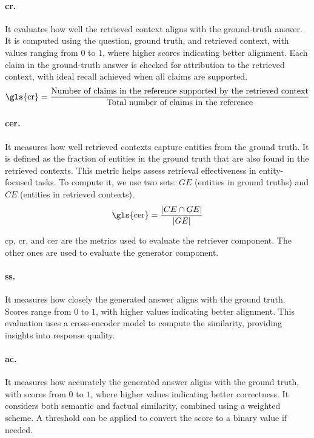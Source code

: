 \paragraph*{\gls{cr}.} It evaluates how well the retrieved context aligns with the ground-truth answer.
It is computed using the question, ground truth, and retrieved context, with values ranging from $0$ to $1$, where higher scores indicating better alignment.
Each claim in the ground-truth answer is checked for attribution to the retrieved context, with ideal recall achieved when all claims are supported.
\[
\text{\gls{cr}} =
\frac{\text{Number of claims in the reference supported by the retrieved context}}
{\text{Total number of claims in the reference}}
\]

\paragraph*{\gls{cer}.} It measures how well retrieved contexts capture entities from the ground truth.
It is defined as the fraction of entities in the ground truth that are also found in the retrieved contexts.
This metric helps assess retrieval effectiveness in entity-focused tasks.
To compute it, we use two sets: $GE$ (entities in ground truths) and $CE$ (entities in retrieved contexts).
\[
\text{\gls{cer}} = \frac{|CE \cap GE|}{|GE|}
\]

\gls{cp}, \gls{cr}, and \gls{cer} are the metrics used to evaluate the retriever component.
The other ones are used to evaluate the generator component.

\paragraph*{\gls{ss}.} It measures how closely the generated answer aligns with the ground truth.
Scores range from $0$ to $1$, with higher values indicating better alignment.
This evaluation uses a cross-encoder model to compute the similarity, providing insights into response quality.

\paragraph*{\gls{ac}.} It measures how accurately the generated answer aligns with the ground truth, with scores from $0$ to $1$, where higher values indicating better correctness.
It considers both semantic and factual similarity, combined using a weighted scheme.
A threshold can be applied to convert the score to a binary value if needed.

